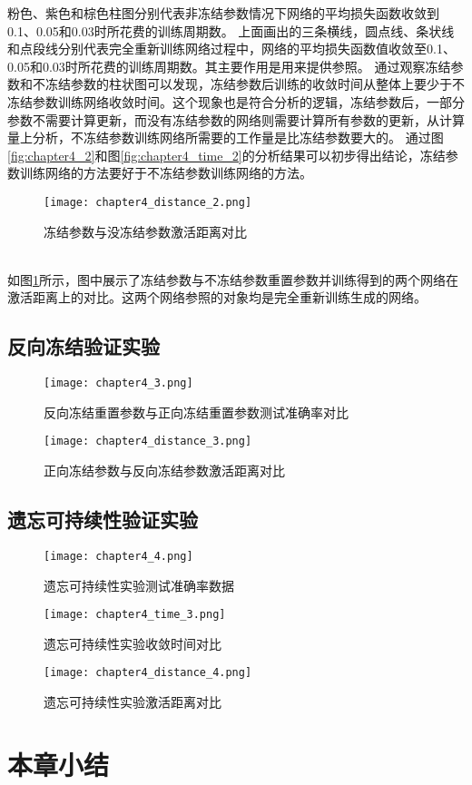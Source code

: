 粉色、紫色和棕色柱图分别代表非冻结参数情况下网络的平均损失函数收敛到0.1、0.05和0.03时所花费的训练周期数。
上面画出的三条横线，圆点线、条状线和点段线分别代表完全重新训练网络过程中，网络的平均损失函数值收敛至0.1、0.05和0.03时所花费的训练周期数。其主要作用是用来提供参照。
通过观察冻结参数和不冻结参数的柱状图可以发现，冻结参数后训练的收敛时间从整体上要少于不冻结参数训练网络收敛时间。这个现象也是符合分析的逻辑，冻结参数后，一部分参数不需要计算更新，而没有冻结参数的网络则需要计算所有参数的更新，从计算量上分析，不冻结参数训练网络所需要的工作量是比冻结参数要大的。
通过图\ref{fig:chapter4_2}和图\ref{fig:chapter4_time_2}的分析结果可以初步得出结论，冻结参数训练网络的方法要好于不冻结参数训练网络的方法。
\begin{figure}
    \centering
    \texttt{[image: chapter4\_distance\_2.png]}
    \caption{冻结参数与没冻结参数激活距离对比}
    \label{fig:chapter4_distance_2}
\end{figure}
\\如图\ref{fig:chapter4_distance_2}所示，图中展示了冻结参数与不冻结参数重置参数并训练得到的两个网络在激活距离上的对比。这两个网络参照的对象均是完全重新训练生成的网络。

\subsection{反向冻结验证实验}
\begin{figure}
    \centering
    \texttt{[image: chapter4\_3.png]}
    \caption{反向冻结重置参数与正向冻结重置参数测试准确率对比}
    \label{fig:chapter4_3}
\end{figure}
\begin{figure}
    \centering
    \texttt{[image: chapter4\_distance\_3.png]}
    \caption{正向冻结参数与反向冻结参数激活距离对比}
    \label{fig:chapter4_distance_3}
\end{figure}
\subsection{遗忘可持续性验证实验}
\begin{figure}
    \centering
    \texttt{[image: chapter4\_4.png]}
    \caption{遗忘可持续性实验测试准确率数据}
    \label{fig:chapter4_4}
\end{figure}
\begin{figure}
    \centering
    \texttt{[image: chapter4\_time\_3.png]}
    \caption{遗忘可持续性实验收敛时间对比}
    \label{fig:chapter4_time_3}
\end{figure}
\begin{figure}
    \centering
    \texttt{[image: chapter4\_distance\_4.png]}
    \caption{遗忘可持续性实验激活距离对比}
    \label{fig:chapter4_distance_4}
\end{figure}
\section{本章小结}

